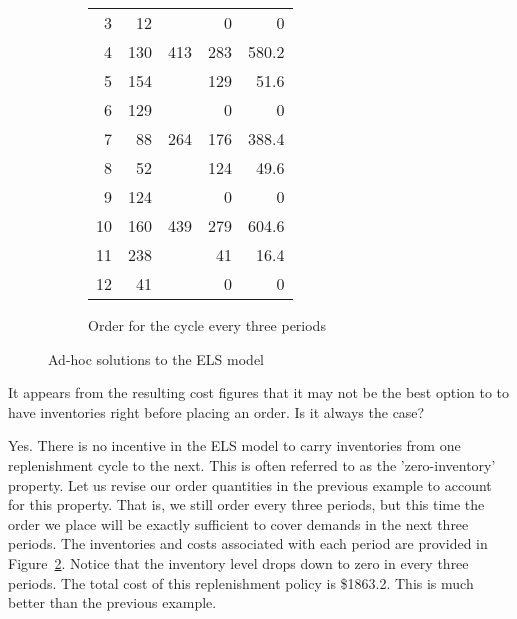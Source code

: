 \begin{exercise}
\begin{solution}
\begin{figure}[htbp]
\begin{subfigure}[b]{0.5\textwidth}
\begin{tabular}{rrrrr}
    3     & 12    &       & 0     & 0 \\
    4     & 130   & 413   & 283   & 580.2 \\
    5     & 154   &       & 129   & 51.6 \\
    6     & 129   &       & 0     & 0 \\
    7     & 88    & 264   & 176   & 388.4 \\
    8     & 52    &       & 124   & 49.6 \\
    9     & 124   &       & 0     & 0 \\
    10    & 160   & 439   & 279   & 604.6 \\
    11    & 238   &       & 41    & 16.4 \\
    12    & 41    &       & 0     & 0 \\
    \bottomrule
    \end{tabular}%
\caption{Order for the cycle every three periods}
\label{fig:3just}
\end{subfigure}
\caption{Ad-hoc solutions to the ELS model}
\end{figure}
\end{solution}
\end{exercise}


\begin{exercise}
It appears from the resulting cost figures that it may not be the best option to to have inventories right before placing an order. Is it always the case? 


\begin{solution}
Yes. There is no incentive in the ELS model to carry inventories from one replenishment cycle to the next. This is often referred to as the 'zero-inventory' property. Let us revise our order quantities in the previous example to account for this property. That is, we still order every three periods, but this time the order we place will be exactly sufficient to cover demands in the next three periods. The inventories and costs associated with each period are provided in Figure~\ref{fig:3just}. Notice that the inventory level drops down to zero in every three periods. The total cost of this replenishment policy is \$1863.2. This is much better than the previous example.
\end{solution}
\end{exercise}

